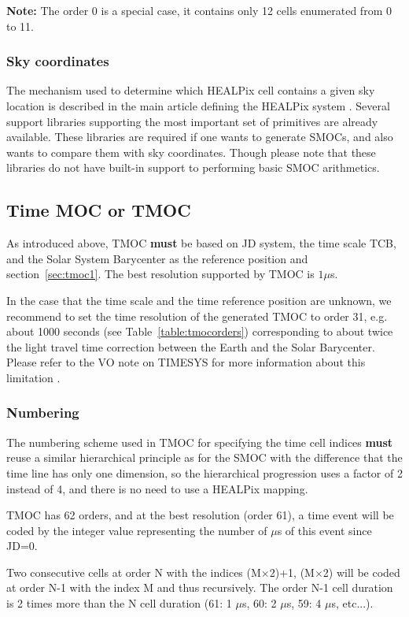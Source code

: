 \documentclass[11pt,a4paper]{ivoa}
\begin{document}
{\bf Note:} The order 0 is a special case, it contains only 12
cells enumerated from 0 to 11.


\subsubsection{Sky coordinates}
The mechanism used to determine which HEALPix cell contains a given
sky location is described in the main article defining the HEALPix
system \citep{2005ApJ...622..759G}. Several support libraries
supporting the most important set of primitives are already available.
These libraries are required if one wants to generate SMOCs, and also
wants to compare them with sky coordinates. Though please
note that these libraries do not have built-in support to performing
basic SMOC arithmetics.

\subsection{Time MOC or TMOC}
As introduced above, TMOC {\bf must} be based on JD system, the time
scale TCB, and the Solar System Barycenter as the reference
position \citep[see also][]{2019ASPC..523..497F} and section~\ref{sec:tmoc1}.
The best resolution supported by TMOC is $1 \mu$s.

In the case that the time scale and the time reference position are unknown,
we recommend to set the time resolution of the generated TMOC to order
31, e.g. about 1000 seconds (see Table~\ref{table:tmocorders}) corresponding
to about twice the light travel time correction between the Earth and
the Solar Barycenter. Please refer to the VO note on TIMESYS for more
information about this limitation \citep{timesysnote}.


\subsubsection{Numbering}
The numbering scheme used in TMOC for specifying the time cell indices
{\bf must} reuse a similar hierarchical principle as for the SMOC
with the difference that the time line has only one dimension, so the
hierarchical progression uses a factor of 2 instead of 4, and there is
no need to use a HEALPix mapping.

TMOC has 62 orders, and at the best
resolution (order 61), a time event will be coded by the integer value
representing the number of $\mu$s of this event since JD=0.

Two consecutive cells at order N with the indices
  (M$\times$2)+1, (M$\times$2) will be coded at order N-1 with the index
  M and thus recursively. The order N-1 cell duration is 2 times more 
  than the N cell duration (61: 1 $\mu$s, 60: 2 $\mu$s, 59: 4 $\mu$s, etc...).
\end{document}
